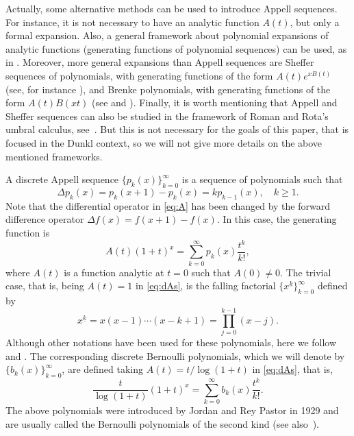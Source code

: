 \documentclass[11pt]{article}
\theoremstyle{plain}
\theoremstyle{remark}
\numberwithin{equation}{section} %
\begin{document}
Actually, some alternative methods can be used to introduce Appell sequences. For instance, it is not necessary to have an analytic function $A(t)$, but only a formal expansion. Also, a general framework about polynomial expansions of analytic functions (generating functions of polynomial sequences) can be used, as in \cite{BoBu, McBr}. Moreover, more general expansions than Appell sequences are Sheffer sequences of polynomials, with generating functions of the form $A(t) e^{xB(t)}$ (see, for instance \cite[Chapter~10]{Ism}), and Brenke polynomials, with generating functions of the form $A(t)B(xt)$ (see \cite{Br} and \cite[(24.7.2), p.~654]{Ism}). Finally, it is worth mentioning that Appell and Sheffer sequences can also be studied in the framework of Roman and Rota's umbral calculus, see~\cite{Rom, RomRot}. But this is not necessary for the goals of this paper, that is focused in the Dunkl context, so we will not give more details on the above mentioned frameworks.

A discrete Appell sequence $\{p_k(x)\}_{k=0}^{\infty}$ is a sequence of polynomials such that
\begin{equation*}
  \Delta p_k(x) = p_k(x+1) - p_k(x) = k p_{k-1}(x), \quad k \ge 1.
\end{equation*}
Note that the differential operator in \eqref{eq:A} has been changed by the forward difference operator $\Delta f(x) = f(x+1)-f(x)$. In this case, the generating function is 
\begin{equation}
\label{eq:dAs}
  A(t)(1+t)^x = \sum_{k=0}^{\infty} p_k(x) \frac{t^k}{k!},
\end{equation}
where $A(t)$ is a function analytic at $t=0$ such that $A(0) \ne 0$. The trivial case, that is, being $A(t)=1$ in \eqref{eq:dAs}, is the falling factorial $\{x^{\underline{k}}\}_{k=0}^{\infty}$ defined by
\[
  x^{\underline{k}} = x(x-1)\cdots (x-k+1) = \prod_{j=0}^{k-1}(x-j).
\]
Although other notations have been used
for these polynomials, here we follow~\cite{Knuth} and \cite[\S\,2.6, p.~47]{GKP}. The corresponding discrete Bernoulli polynomials, which we will denote by $\{b_k(x)\}_{k=0}^{\infty}$, are defined taking $A(t)=t/\log(1+t)$ in \eqref{eq:dAs}, that is,
\begin{equation}
\label{eq:BD-def}
  \frac{t}{\log(1+t)}(1+t)^x = \sum_{k=0}^{\infty} b_k(x)\frac{t^k}{k!}.
\end{equation}
The above polynomials were introduced by Jordan \cite{Jor} and Rey Pastor \cite{RP-BSMA} in 1929 and are usually called the Bernoulli polynomials of the second kind (see also~\cite{Bab}). 
\end{document}
